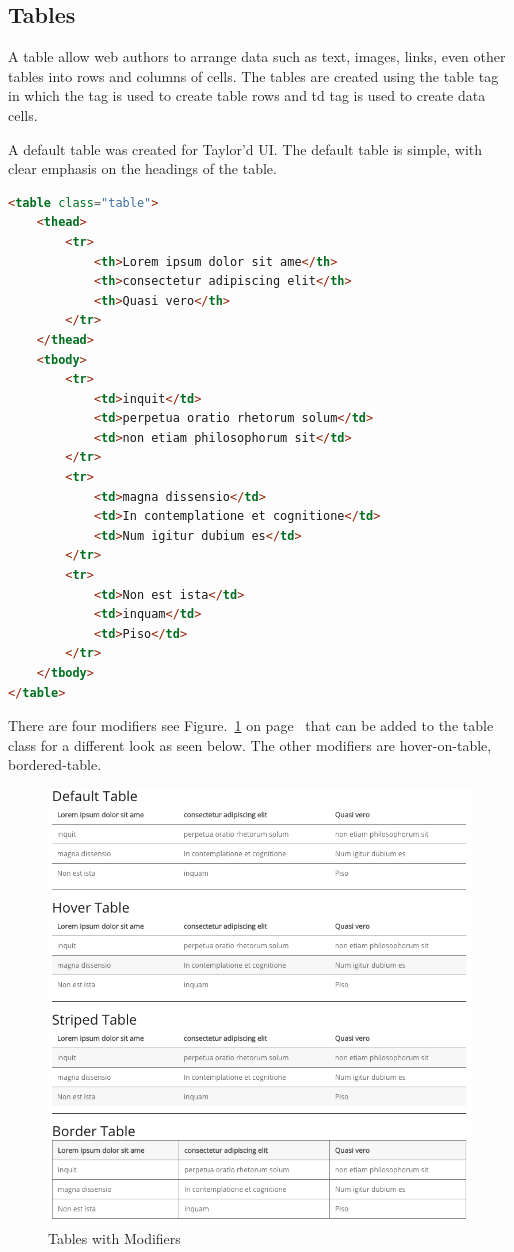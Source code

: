 \subsection*{Tables}
A table allow web authors to arrange data such as text, images, links, even other tables into rows and columns of cells. The tables are created using the table tag in which the  tag is used to create table rows and td tag is used to create data cells.

A default table was created for Taylor'd UI. The default table is simple, with clear emphasis on the headings of the table. 

\begin{lstlisting}[language=HTML]
<table class="table">
	<thead>
		<tr>
			<th>Lorem ipsum dolor sit ame</th>
			<th>consectetur adipiscing elit</th>
			<th>Quasi vero</th>
		</tr>
	</thead>
	<tbody>
		<tr>
			<td>inquit</td>
			<td>perpetua oratio rhetorum solum</td>
			<td>non etiam philosophorum sit</td>
		</tr>
		<tr>
			<td>magna dissensio</td>
			<td>In contemplatione et cognitione</td>
			<td>Num igitur dubium es</td>
		</tr>
		<tr>
			<td>Non est ista</td>
			<td>inquam</td>
			<td>Piso</td>
		</tr>
	</tbody>
</table>
\end{lstlisting}

There are four modifiers see Figure.~\ref{fig:tableMod} on  page~\pageref{fig:tableMod} that can be added to the table class for a different look as seen below. The other modifiers are hover-on-table,  bordered-table.

\newpage

\begin{figure}[ht]
\centering
\includegraphics[scale=0.24]{images/tables}
\caption{Tables with Modifiers}
  \label{fig:tableMod}
\end{figure}

